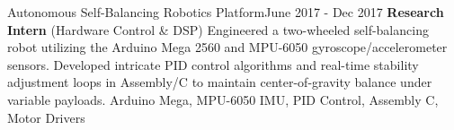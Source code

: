 \begin{projects}
        \project
	{Autonomous Self-Balancing Robotics Platform}{June 2017 - Dec 2017}
	{{\textbf{Research Intern} (Hardware Control \& DSP)}}
	{Engineered a two-wheeled self-balancing robot utilizing the Arduino Mega 2560 and MPU-6050 gyroscope/accelerometer sensors. Developed intricate PID control algorithms and real-time stability adjustment loops in Assembly/C to maintain center-of-gravity balance under variable payloads.}
	{Arduino Mega, MPU-6050 IMU, PID Control, Assembly C, Motor Drivers}
\end{projects}